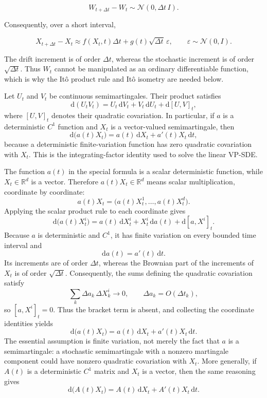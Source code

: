 \documentclass[11pt,a4paper]{article}
\theoremstyle{definition}
\begin{document}
\[
W_{t+\Delta t}-W_t\sim\mathcal{N}(0,\Delta t\,I).
\]

Consequently, over a short interval,

\[
X_{t+\Delta t}-X_t
\approx
f(X_t,t)\Delta t+g(t)\sqrt{\Delta t}\,\varepsilon,
\qquad
\varepsilon\sim\mathcal{N}(0,I).
\]

The drift increment is of order $\Delta t$, whereas the stochastic increment is of order
$\sqrt{\Delta t}$. Thus $W_t$ cannot be manipulated as an ordinary differentiable
function, which is why the It\^o product rule and It\^o isometry are needed below.

\begin{theorem}
Let $U_t$ and $V_t$ be continuous semimartingales. Their product satisfies
\[
\mathrm{d}(U_tV_t)
=U_t\,\mathrm{d}V_t+V_t\,\mathrm{d}U_t+\mathrm{d}[U,V]_t,
\]
where $[U,V]_t$ denotes their quadratic covariation. In particular, if $a$ is a
deterministic $C^1$ function and $X_t$ is a vector-valued semimartingale, then
\[
\mathrm{d}\bigl(a(t)X_t\bigr)
=a(t)\,\mathrm{d}X_t+a'(t)X_t\,\mathrm{d}t,
\]
because a deterministic finite-variation function has zero quadratic covariation with
$X_t$. This is the integrating-factor identity used to solve the linear VP-SDE.
\end{theorem}

\begin{note}
The function $a(t)$ in the special formula is a scalar deterministic function, while
$X_t\in\mathbb{R}^d$ is a vector. Therefore $a(t)X_t\in\mathbb{R}^d$ means scalar
multiplication, coordinate by coordinate:
\[
a(t)X_t
=\bigl(a(t)X_t^1,\ldots,a(t)X_t^d\bigr).
\]
Applying the scalar product rule to each coordinate gives
\[
\mathrm{d}\bigl(a(t)X_t^i\bigr)
=a(t)\,\mathrm{d}X_t^i+X_t^i\,\mathrm{d}a(t)
+\mathrm{d}[a,X^i]_t.
\]
Because $a$ is deterministic and $C^1$, it has finite variation on every bounded time
interval and
\[
\mathrm{d}a(t)=a'(t)\,\mathrm{d}t.
\]
Its increments are of order $\Delta t$, whereas the Brownian part of the increments of
$X_t$ is of order $\sqrt{\Delta t}$. Consequently, the sums defining the quadratic
covariation satisfy
\[
\sum_k \Delta a_k\,\Delta X^i_k
\longrightarrow 0,
\qquad
\Delta a_k=O(\Delta t_k),
\]
so $[a,X^i]_t=0$. Thus the bracket term is absent, and collecting the coordinate
identities yields
\[
\mathrm{d}\bigl(a(t)X_t\bigr)
=a(t)\,\mathrm{d}X_t+a'(t)X_t\,\mathrm{d}t.
\]
The essential assumption is finite variation, not merely the fact that $a$ is a
semimartingale: a stochastic semimartingale with a nonzero martingale component could
have nonzero quadratic covariation with $X_t$. More generally, if $A(t)$ is a
deterministic $C^1$ matrix and $X_t$ is a vector, then the same reasoning gives
\[
\mathrm{d}\bigl(A(t)X_t\bigr)
=A(t)\,\mathrm{d}X_t+A'(t)X_t\,\mathrm{d}t.
\]
\end{note}
\end{document}
